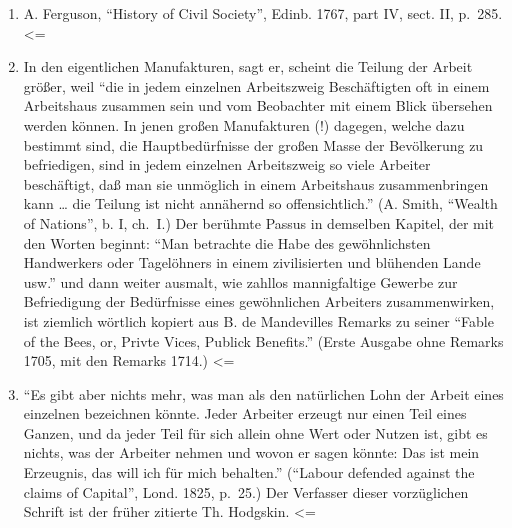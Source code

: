 {\begin{enumerate}
  Sudbury, Krepps in Norwich, Halbwollstoffe in Kendal, Decken in
  Whitney usw.!'' (Berkeley, ``The Qerist'', 1750, § 520.) \textless{}=
\item
  A. Ferguson, ``History of Civil Society'', Edinb. 1767, part IV, sect.
  II, p.~285. \textless{}=
\item
  In den eigentlichen Manufakturen, sagt er, scheint die Teilung der
  Arbeit größer, weil ``die in jedem einzelnen Arbeitszweig
  Beschäftigten oft in einem Arbeitshaus zusammen sein und vom
  Beobachter mit einem Blick übersehen werden können. In jenen großen
  Manufakturen (!) dagegen, welche dazu bestimmt sind, die
  Hauptbedürfnisse der großen Masse der Bevölkerung zu befriedigen, sind
  in jedem einzelnen Arbeitszweig so viele Arbeiter beschäftigt, daß man
  sie unmöglich in einem Arbeitshaus zusammenbringen kann \ldots{} die
  Teilung ist nicht annähernd so offensichtlich.'' (A. Smith, ``Wealth
  of Nations'', b. I, ch.~I.) Der berühmte Passus in demselben Kapitel,
  der mit den Worten beginnt: ``Man betrachte die Habe des
  gewöhnlichsten Handwerkers oder Tagelöhners in einem zivilisierten und
  blühenden Lande usw.'' und dann weiter ausmalt, wie zahllos
  mannigfaltige Gewerbe zur Befriedigung der Bedürfnisse eines
  gewöhnlichen Arbeiters zusammenwirken, ist ziemlich wörtlich kopiert
  aus B. de Mandevilles Remarks zu seiner ``Fable of the Bees, or,
  Privte Vices, Publick Benefits.'' (Erste Ausgabe ohne Remarks 1705,
  mit den Remarks 1714.) \textless{}=
\item
  ``Es gibt aber nichts mehr, was man als den natürlichen Lohn der
  Arbeit eines einzelnen bezeichnen könnte. Jeder Arbeiter erzeugt nur
  einen Teil eines Ganzen, und da jeder Teil für sich allein ohne Wert
  oder Nutzen ist, gibt es nichts, was der Arbeiter nehmen und wovon er
  sagen könnte: Das ist mein Erzeugnis, das will ich für mich
  behalten.'' (``Labour defended against the claims of Capital'', Lond.
  1825, p.~25.) Der Verfasser dieser vorzüglichen Schrift ist der früher
  zitierte Th. Hodgskin. \textless{}=
\end{enumerate}

}
